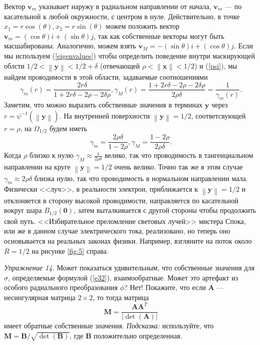 \documentclass[a4paper, 12pt]{article}
\newcommand{\normb}[1]{\left\lVert\textbf{#1}\right\rVert}
\begin{document}
Вектор $\textbf{v}_m$ указывает наружу в радиальном направлении от начала,
$\textbf{v}_m$ --- по касательной к любой окружности, с центром в нуле. Действительно,
в точке $x_1 = r\cos(\theta), x_2 = r\sin(\theta)$ можем положить вектор 
$\textbf{v}_m = (\cos\theta)i+(\sin\theta)j$, так как собственные векторы могут быть
масшабированы. Аналогично, можем взять $\textbf{v}_M = -(\sin\theta)i+(\cos\theta)j$.
Если мы используем (\ref{eigenvalues}) чтобы определить поведение внутри маскирующей
облсти $1/2 < \normb{y} < 1/2 + \delta$ (отвечающей $\rho < 
\normb{x}<1/2$) и (\ref{psi}), мы найдем проводимости в этой области, 
задаваемые соотношениями
\begin{equation}
\gamma_m(r) = \frac{2r\delta}{1+2r\delta-2\rho-2\delta\rho},
\gamma_M(r)= \frac{1+2r\delta-2\rho-2\delta\rho}{2\rho\delta} = \frac{1}{\gamma_m(r)}.
\end{equation}
Заметим, что можно выразить собственные значения в терминах $\textbf{y}$ через
$r = \psi^{-1}(\normb{y})$. На внутренней поверхности $\normb{y}=1/2$,
соответсвующей $r = \rho$, на $\Omega_{1/2}$ будем иметь
\begin{equation*}
\gamma_m = \frac{2\rho\delta}{1-2\rho},
\gamma_M = \frac{1-2\rho}{2\rho\delta}.
\end{equation*}
Когда $\rho$ близко к нулю $\gamma_M \approx \frac{1}{2\rho\delta}$ велико, так что
проводимость в тангенциальном направлении на круге $\normb{y} = 1/2$ очень 
велико. Точно так же в этом случае $\gamma_m \approx 2\rho\delta$ близка нулю, так что
проводимость в нормальном направлении мала. Физически <<луч>>, в реальности электрон,
приближается к $\normb{y}=1/2$ и отклоняется в сторону высокой проводимости,
направляется по касательной вокруг шара $B_{1/2}(\textbf{0})$, затем выталкивается
с другой стороны чтобы продолжить свой путь. <<Избирательное преломление световых
лучей>> мистера Спока, или же в данном случае электрического тока, реализовано,
но теперь оно основывается на реальных законах физики. Например, взгляните 
на поток около $R=1/2$ на рисунке \ref{fig:5} справа.

\textit{Упражнение 14.} Может показаться удивительным, что собственные значения для
$\sigma$, определяемые формулой (\ref{e32}), взаимообратные. Может это артефакт
из особого радиального преобразования $\phi$? Нет! Покажите, что если $\textbf{A}$ 
--- 	несингулярная матрица $2 \times 2$, то тогда матрица
\begin{equation*}
\textbf{M} = \frac{\textbf{A}\textbf{A}^T}{|\det(\textbf{A})|}
\end{equation*}
имеет обратные собственные значения. \textit{Подсказка:} используйте, что $\textbf{M}
=  \textbf{B}/\sqrt{\det(\textbf{B})}$, где $\textbf{B}$ положительно определенная.
\end{document}
